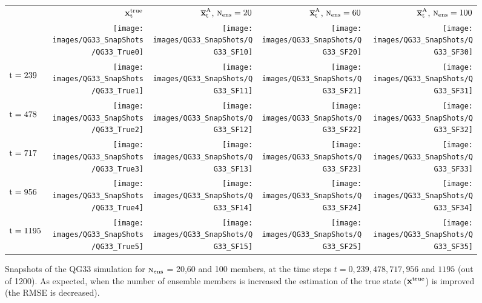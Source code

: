 \documentclass[12pt]{article}
\newcommand{\Nens}{\textsc{n}_{{\rm ens}}}
\newcommand{\xmeana}{{\bf \overline{x}}^{\rm A}}
\newcommand{\xt}{{\bf x}^{\rm true}}
\begin{document}
\begin{figure}[H]
\centering
\begin{tabular}{VNNNN}
& $\xt_{\rm t} $ & $\xmeana_{\rm t}$, $\Nens = 20$ & $\xmeana_{\rm t}$, $\Nens = 60$ & $\xmeana_{\rm t}$, $\Nens = 100$\\ 
 &\texttt{[image: images/QG33\_SnapShots/QG33\_True0]} &\texttt{[image: images/QG33\_SnapShots/QG33\_SF10]} &\texttt{[image: images/QG33\_SnapShots/QG33\_SF20]} &\texttt{[image: images/QG33\_SnapShots/QG33\_SF30]} \\
\begin{sideways} ${\rm t = 239}$ \end{sideways} &\texttt{[image: images/QG33\_SnapShots/QG33\_True1]} &\texttt{[image: images/QG33\_SnapShots/QG33\_SF11]} &\texttt{[image: images/QG33\_SnapShots/QG33\_SF21]} &\texttt{[image: images/QG33\_SnapShots/QG33\_SF31]} \\
\begin{sideways} ${\rm t = 478}$ \end{sideways} &\texttt{[image: images/QG33\_SnapShots/QG33\_True2]} &\texttt{[image: images/QG33\_SnapShots/QG33\_SF12]} &\texttt{[image: images/QG33\_SnapShots/QG33\_SF22]} &\texttt{[image: images/QG33\_SnapShots/QG33\_SF32]} \\
\begin{sideways} ${\rm t = 717}$ \end{sideways} &\texttt{[image: images/QG33\_SnapShots/QG33\_True3]} &\texttt{[image: images/QG33\_SnapShots/QG33\_SF13]} &\texttt{[image: images/QG33\_SnapShots/QG33\_SF23]} &\texttt{[image: images/QG33\_SnapShots/QG33\_SF33]} \\
\begin{sideways} ${\rm t = 956}$ \end{sideways} &\texttt{[image: images/QG33\_SnapShots/QG33\_True4]} &\texttt{[image: images/QG33\_SnapShots/QG33\_SF14]} &\texttt{[image: images/QG33\_SnapShots/QG33\_SF24]} &\texttt{[image: images/QG33\_SnapShots/QG33\_SF34]} \\
\begin{sideways} ${\rm t = 1195}$ \end{sideways} &\texttt{[image: images/QG33\_SnapShots/QG33\_True5]} &\texttt{[image: images/QG33\_SnapShots/QG33\_SF15]} &\texttt{[image: images/QG33\_SnapShots/QG33\_SF25]} &\texttt{[image: images/QG33\_SnapShots/QG33\_SF35]} 
\end{tabular}
\caption{Snapshots of the QG33 simulation for $\Nens$ = 20,60 and 100 members, at the time steps $t=0,239,478,717,956$ and $1195$ (out of 1200). As expected, when the number of ensemble members is increased the estimation of the true state ($\xt$) is improved (the RMSE is decreased).
}
\label{Fig:QG33-Snapshots-Simulation}
\end{figure}
\end{document}
